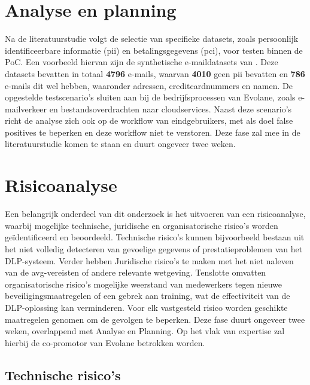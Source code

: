\section{Analyse en planning}%

Na de literatuurstudie volgt de selectie van specifieke datasets, zoals persoonlijk identificeerbare informatie (\gls{pii}) en betalingsgegevens (\gls{pci}), voor testen binnen de PoC.
Een voorbeeld hiervan zijn de synthetische e-maildatasets van \textcite{Whelan2014}. 
Deze datasets bevatten in totaal \textbf{4796} e-mails, waarvan \textbf{4010} geen \gls{pii} bevatten en \textbf{786} e-mails dit wel hebben, 
waaronder adressen, creditcardnummers en namen. 
De opgestelde testscenario's sluiten aan bij de bedrijfsprocessen van Evolane, zoals e-mailverkeer en bestandsoverdrachten naar cloudservices. 
Naast deze scenario's richt de analyse zich ook op de workflow van eindgebruikers, met als doel false positives te beperken en deze workflow niet te verstoren.
Deze fase zal mee in de literatuurstudie komen te staan en duurt ongeveer twee weken.

\section{Risicoanalyse}%

Een belangrijk onderdeel van dit onderzoek is het uitvoeren van een risicoanalyse, waarbij mogelijke technische, juridische en organisatorische risico's worden geïdentificeerd en beoordeeld. 
Technische risico's kunnen bijvoorbeeld bestaan uit het niet volledig detecteren van gevoelige gegevens of prestatieproblemen van het DLP-systeem. 
Verder hebben Juridische risico's te maken met het niet naleven van de \gls{avg}-vereisten of andere relevante wetgeving. 
Tenslotte omvatten organisatorische risico's mogelijke weerstand van medewerkers tegen nie\-uwe beveiligingsmaatregelen of een gebrek aan training, 
wat de effectiviteit van de DLP-oplossing kan verminderen. 
Voor elk vastgesteld risico worden geschikte maatregelen genomen om de gevolgen te beperken. 
Deze fase duurt ongeveer twee weken, overlappend met Analyse en Planning. Op het vlak van expertise zal hierbij de co-promotor van Evolane betrokken worden. 

\subsection{Technische risico's}

